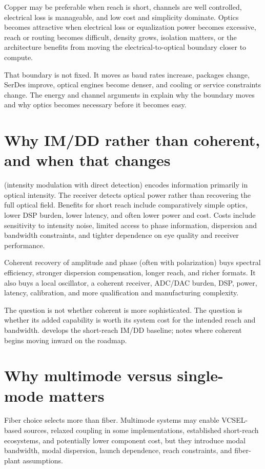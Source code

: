 Copper may be preferable when reach is short, channels are well controlled,
electrical loss is manageable, and low cost and simplicity dominate. Optics
becomes attractive when electrical loss or equalization power becomes excessive,
reach or routing becomes difficult, density grows, isolation matters, or the
architecture benefits from moving the electrical-to-optical boundary closer to
compute.

That boundary is not fixed. It moves as baud rates increase, packages change,
SerDes improve, optical engines become denser, and cooling or service
constraints change. The energy and channel arguments in
 explain why the boundary moves and why optics becomes
necessary before it becomes easy.

\section{Why IM/DD rather than coherent, and when that changes}

 (intensity modulation with direct detection) encodes
information primarily in optical intensity. The receiver detects optical power
rather than recovering the full optical field. Benefits for short reach include
comparatively simple optics, lower DSP burden, lower latency, and often lower
power and cost. Costs include sensitivity to intensity noise, limited access to
phase information, dispersion and bandwidth constraints, and tighter dependence
on eye quality and receiver performance.

Coherent recovery of amplitude and phase (often with polarization) buys spectral
efficiency, stronger dispersion compensation, longer reach, and richer formats.
It also buys a local oscillator, a coherent receiver, ADC/DAC burden, DSP,
power, latency, calibration, and more qualification and manufacturing
complexity.

The question is not whether coherent is more sophisticated. The question is
whether its added capability is worth its system cost for the intended reach and
bandwidth.  develops the short-reach IM/DD baseline;
 notes where coherent begins moving inward on the roadmap.

\section{Why multimode versus single-mode matters}

Fiber choice selects more than fiber. Multimode systems may enable VCSEL-based
sources, relaxed coupling in some implementations, established short-reach
ecosystems, and potentially lower component cost, but they introduce modal
bandwidth, modal dispersion, launch dependence, reach constraints, and
fiber-plant assumptions.

